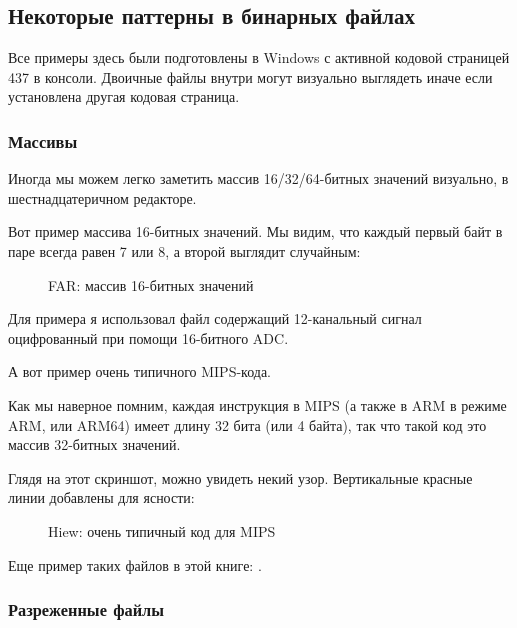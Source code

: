 
\subsection{Некоторые паттерны в бинарных файлах}

Все примеры здесь были подготовлены в Windows с активной кодовой страницей 437
в консоли.
Двоичные файлы внутри могут визуально выглядеть иначе если установлена другая кодовая страница.

\clearpage
\subsubsection{Массивы}

Иногда мы можем легко заметить массив 16/32/64-битных значений визуально, в шестнадцатеричном 
редакторе.

Вот пример массива 16-битных значений.
Мы видим, что каждый первый байт в паре всегда равен 7 или 8, а второй выглядит случайным:

\begin{figure}[H]
\centering
{}
\caption{FAR: массив 16-битных значений}
\end{figure}

Для примера я использовал файл содержащий 12-канальный сигнал оцифрованный при помощи 16-битного \ac{ADC}.

\clearpage
{}
\par А вот пример очень типичного MIPS-кода.

Как мы наверное помним, каждая инструкция в MIPS (а также в ARM в режиме ARM, или ARM64) имеет 
длину 32 бита (или 4 байта),
так что такой код это массив 32-битных значений.

Глядя на этот скриншот, можно увидеть некий узор.
Вертикальные красные линии добавлены для ясности:

\begin{figure}[H]
\centering
{}
\caption{Hiew: очень типичный код для MIPS}
\end{figure}

Еще пример таких файлов в этой книге: 
.

\clearpage
\subsubsection{Разреженные файлы}

